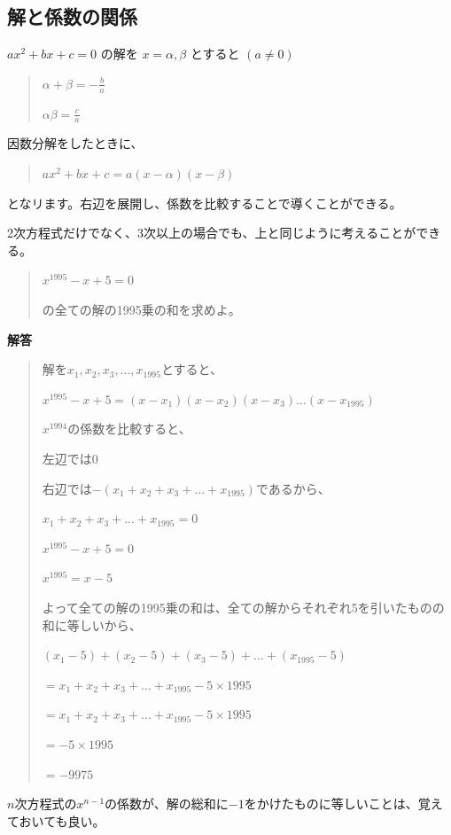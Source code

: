 \documentclass[uplatex,fleqn]{jsbook}
\begin{document}
\subsection{解と係数の関係}

$ax^2+bx+c=0$
の解を
$x=\alpha,\beta$
とすると
$\left(a\neq0\right)$
\begin{quote}
    $\displaystyle \alpha+\beta=-\frac{b}{a}$

    $\displaystyle \alpha\beta=\frac{c}{a}$
\end{quote}
因数分解をしたときに、
\begin{quote}
    $ax^2+bx+c=a\left(x-\alpha\right)\left(x-\beta\right)$
\end{quote}
となリます。右辺を展開し、係数を比較することで導くことができる。

2次方程式だけでなく、3次以上の場合でも、上と同じように考えることができる。

\begin{quote}
    $x^{1995}-x+5=0$

    の全ての解の1995乗の和を求めよ。
\end{quote}

\vspace{15pt} {\large \textbf{解答}}
\begin{quote}
    解を$x_1,x_2,x_3,\dots,x_{1995}$とすると、

    $x^{1995}-x+5=\left(x-x_1\right)\left(x-x_2\right)\left(x-x_3\right)\dots \left(x-x_{1995}\right)$

    $x^{1994}$の係数を比較すると、

    左辺では$0$

    右辺では$-\left(x_1+x_2+x_3+\dots +x_{1995}\right)$であるから、

    $x_1+x_2+x_3+\dots +x_{1995}=0$

    $x^{1995}-x+5=0$

    $x^{1995}=x-5$

    よって全ての解の1995乗の和は、全ての解からそれぞれ5を引いたものの和に等しいから、

    $\left(x_1-5\right)+\left(x_2-5\right)+\left(x_3-5\right)+\dots +\left(x_{1995}-5\right)$

    $=x_1+x_2+x_3+\dots +x_{1995}-5\times 1995$

    $=x_1+x_2+x_3+\dots +x_{1995}-5\times 1995$

    $=-5\times 1995$

    $=-9975$
\end{quote}
$n$次方程式の$x^{n-1}$の係数が、解の総和に$-1$をかけたものに等しいことは、覚えておいても良い。
\end{document}
